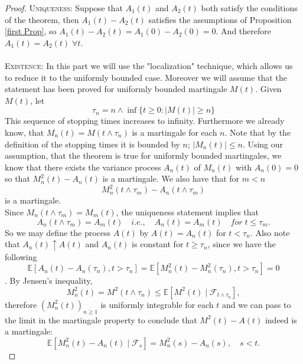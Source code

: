 \documentclass[11pt,a4paper, final]{article}
\theoremstyle{definition}
\begin{document}
\begin{proof}
\textsc{Uniqueness:} Suppose that $A_1(t)$ and $A_2(t)$ both satisfy the conditions of the theorem, then $A_1(t)-A_2(t)$ satisfies the assumptions of Proposition \ref{first Prop}, so $A_1(t)-A_2(t)=A_1(0)-A_2(0)=0$. And therefore $A_1(t)=A_2(t) \; \forall t$.
\\\\
\textsc{Existence:} In this part we will use the "localization" technique, which allows us to reduce it to the uniformly bounded case. Moreover we will assume that the statement has been proved for uniformly bounded martingale $M(t)$. %
Given $M(t)$, let 
$$\tau_n = n \wedge \inf\{t \geq 0: |M(t)|\geq n\}$$
This sequence of stopping times increases to infinity. Furthermore we already know, that $M_n(t)=M(t \wedge \tau_n)$ is a martingale for each $n$. Note that by the definition of the stopping times it is bounded by $n$; $| M_n(t) |\leq n$. Using our assumption, that the theorem is true for uniformly bounded martingales, we know that there exists the variance process $A_n(t)$ of $M_n(t)$ with $A_n(0)=0$ so that $M_n^2(t)-A_n(t)$ is a martingale. We also have that for $m<n$ $$M_n^2(t \wedge \tau_m)-A_n(t \wedge \tau_m)$$ is a martingale.\\
Since $M_n(t \wedge \tau_m)=M_m(t)$, the uniqueness statement implies that 
$$A_n(t \wedge \tau_m)=A_m(t) \quad i.e.,\quad  A_n(t)=A_m(t) \quad for \;t\leq \tau_m.$$
So we may define the process $A(t)$ by $A(t)=A_n(t)$ for $t<\tau_n$. Also note that $A_n(t) \uparrow A(t)$ and $A_n(t)$ is constant for $t\geq \tau_n$, since we have the following
$$\mathbb{E}[A_n(t)-A_n(\tau_n), t>\tau_n]= \mathbb{E}[M_n^2(t)-M_n^2(\tau_n), t>\tau_n]=0$$.
By Jensen's inequality,
$$M_n^2(t)=M^2(t \wedge \tau_n) \leq \mathbb{E}[M^2(t) \mid \mathscr{F}_{t \wedge \tau_n}],$$
therefore $(M_n^2(t))_{n\geq 1}$ is uniformly integrable for each $t$ and we can pass to the limit in the martingale property to conclude that $M^2(t)-A(t)$ indeed is a martingale: 
$$\mathbb{E}[M_n^2(t)-A_n(t) \mid \mathscr{F}_s]=M_n^2(s)-A_n(s), \quad s<t.$$

\end{proof}
\end{document}
